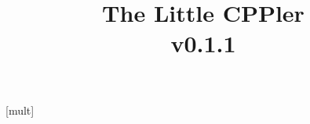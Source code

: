 \usepackage{framed}
\usepackage{mathtools}

\usepackage{graphicx}



\usepackage[l2tabu, orthodox]{nag} %

\makeatletter
\newcommand*{\myfnsymbolsingle}[1]{%
  \ensuremath{%
    \ifcase#1%
    \or %
      \dagger
    \or %
      \ddagger
    \or %
      \mathsection
    \else %
      \@ctrerr
    \fi
  }%
}
\makeatother

\newcommand*{\myfnsymbol}[1]{%
  \myfnsymbolsingle{\value{#1}}%
}

\usepackage{alphalph}
\newalphalph{\myfnsymbolmult}[mult]{\myfnsymbolsingle}{}

\renewcommand*{\thempfootnote}{%
  \myfnsymbolmult{\value{mpfootnote}}%
}


\usepackage{fontspec}
\usepackage{setspace} %

\newcommand{\inlinetodo}[1]{\todo[inline,size=\normalsize]{#1}}

\title{%
  \huge The Little CPPler \\
  \large v0.1.1}
